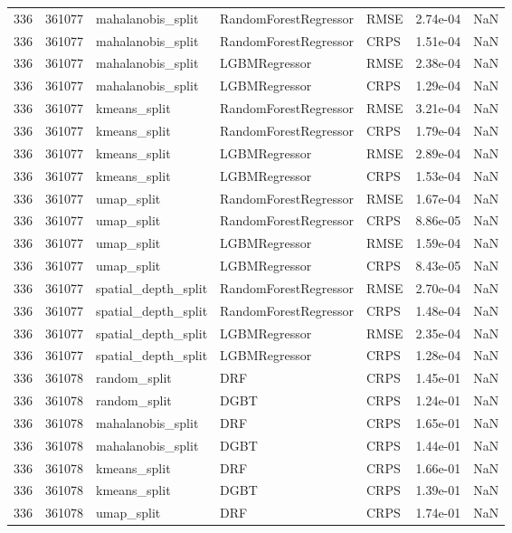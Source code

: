 \begin{tabular}{rrlllrr}
336 & 361077 & mahalanobis\_split & RandomForestRegressor & RMSE & 2.74e-04 & NaN \\
336 & 361077 & mahalanobis\_split & RandomForestRegressor & CRPS & 1.51e-04 & NaN \\
336 & 361077 & mahalanobis\_split & LGBMRegressor & RMSE & 2.38e-04 & NaN \\
336 & 361077 & mahalanobis\_split & LGBMRegressor & CRPS & 1.29e-04 & NaN \\
336 & 361077 & kmeans\_split & RandomForestRegressor & RMSE & 3.21e-04 & NaN \\
336 & 361077 & kmeans\_split & RandomForestRegressor & CRPS & 1.79e-04 & NaN \\
336 & 361077 & kmeans\_split & LGBMRegressor & RMSE & 2.89e-04 & NaN \\
336 & 361077 & kmeans\_split & LGBMRegressor & CRPS & 1.53e-04 & NaN \\
336 & 361077 & umap\_split & RandomForestRegressor & RMSE & 1.67e-04 & NaN \\
336 & 361077 & umap\_split & RandomForestRegressor & CRPS & 8.86e-05 & NaN \\
336 & 361077 & umap\_split & LGBMRegressor & RMSE & 1.59e-04 & NaN \\
336 & 361077 & umap\_split & LGBMRegressor & CRPS & 8.43e-05 & NaN \\
336 & 361077 & spatial\_depth\_split & RandomForestRegressor & RMSE & 2.70e-04 & NaN \\
336 & 361077 & spatial\_depth\_split & RandomForestRegressor & CRPS & 1.48e-04 & NaN \\
336 & 361077 & spatial\_depth\_split & LGBMRegressor & RMSE & 2.35e-04 & NaN \\
336 & 361077 & spatial\_depth\_split & LGBMRegressor & CRPS & 1.28e-04 & NaN \\
336 & 361078 & random\_split & DRF & CRPS & 1.45e-01 & NaN \\
336 & 361078 & random\_split & DGBT & CRPS & 1.24e-01 & NaN \\
336 & 361078 & mahalanobis\_split & DRF & CRPS & 1.65e-01 & NaN \\
336 & 361078 & mahalanobis\_split & DGBT & CRPS & 1.44e-01 & NaN \\
336 & 361078 & kmeans\_split & DRF & CRPS & 1.66e-01 & NaN \\
336 & 361078 & kmeans\_split & DGBT & CRPS & 1.39e-01 & NaN \\
336 & 361078 & umap\_split & DRF & CRPS & 1.74e-01 & NaN \\

\end{tabular}
